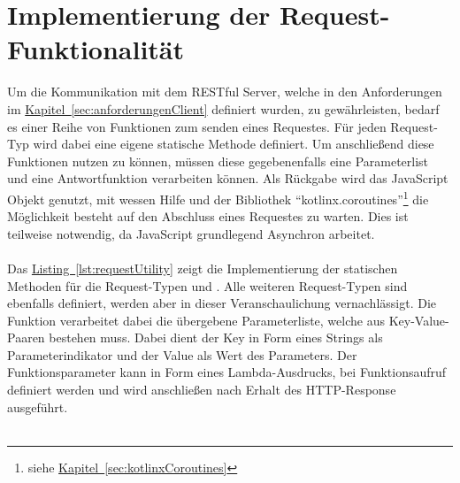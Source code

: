 \section{Implementierung der Request-Funktionalität}
Um die Kommunikation mit dem \gls{REST}ful Server, welche in den Anforderungen im \hyperref[sec:anforderungenClient]{Kapitel~\ref{sec:anforderungenClient}} definiert wurden, zu gewährleisten, bedarf es einer Reihe von Funktionen zum senden eines Requestes. Für jeden Request-Typ wird dabei eine eigene statische Methode definiert. Um anschließend diese Funktionen nutzen zu können, müssen diese gegebenenfalls eine Parameterlist und eine Antwortfunktion verarbeiten können. Als Rückgabe wird das JavaScript  Objekt genutzt, mit wessen Hilfe und der Bibliothek \enquote{kotlinx.coroutines}\footnote{siehe \hyperref[sec:kotlinxCoroutines]{Kapitel~\ref{sec:kotlinxCoroutines}}} die Möglichkeit besteht auf den Abschluss eines Requestes zu warten. Dies ist teilweise notwendig, da JavaScript grundlegend Asynchron arbeitet.\\
\\
Das \hyperref[lst:requestUtility]{Listing~\ref{lst:requestUtility}} zeigt die Implementierung der statischen Methoden für die Request-Typen  und . Alle weiteren Request-Typen sind ebenfalls definiert, werden aber in dieser Veranschaulichung vernachlässigt. Die Funktion  verarbeitet dabei die übergebene Parameterliste, welche aus Key-Value-Paaren bestehen muss. Dabei dient der Key in Form eines Strings als Parameterindikator und der Value als Wert des Parameters. Der Funktionsparameter  kann in Form eines Lambda-Ausdrucks, bei Funktionsaufruf definiert werden und wird anschließen nach Erhalt des \gls{HTTP}-Response ausgeführt.\\
\\
